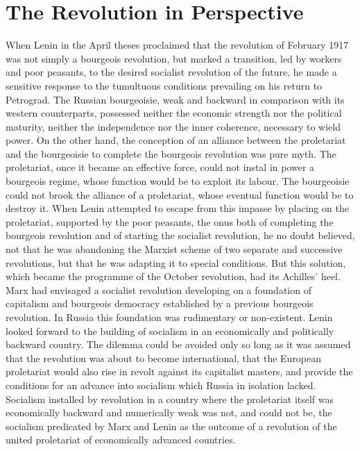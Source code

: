 \chapter{The Revolution in Perspective}

When Lenin in the April theses proclaimed that the revolution of February 1917 was not simply a bourgeois revolution, but marked a transition, led by workers and poor peasants, to the desired socialist revolution of the future, he made a sensitive response to the tumultuous conditions prevailing on his return to Petrograd. The Russian bourgeoisie, weak and backward in comparison with its western counterparts, possessed neither the economic strength nor the political maturity, neither the independence nor the inner coherence, necessary to wield power. On the other hand, the conception of an alliance between the proletariat and the bourgeoisie to complete the bourgeois revolution was pure myth. The proletariat, once it became an effective force, could not instal in power a bourgeois regime, whose function would be to exploit its labour. The bourgeoisie could not brook the alliance of a proletariat, whose eventual function would be to destroy it. When Lenin attempted to escape from this impasse by placing on the proletariat, supported by the poor peasants, the onus both of completing the bourgeois revolution and of starting the socialist revolution, he no doubt believed, not that he was abandoning the Marxist scheme of two separate and successive revolutions, but that he was adapting it to special conditions. But this solution, which became the programme of the October revolution, had its Achilles' heel. Marx had envisaged a socialist revolution developing on a foundation of capitalism and bourgeois democracy established by a previous bourgeois revolution.  In Russia this foundation was rudimentary or non-existent. Lenin looked forward to the building of socialism in an economically and politically backward country. The dilemma could be avoided only so long as it was assumed that the revolution was about to become international, that the European proletariat would also rise in revolt against its capitalist masters, and provide the conditions for an advance into socialism which Russia in isolation lacked. Socialism installed by revolution in a country where the proletariat itself was economically backward and numerically weak was not, and could not be, the socialism predicated by Marx and Lenin as the outcome of a revolution of the united proletariat of economically advanced countries. 

